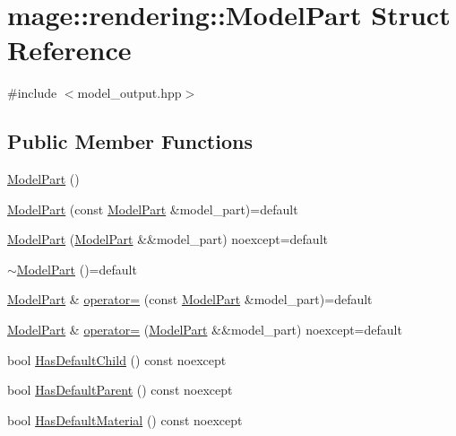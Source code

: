 \hypertarget{structmage_1_1rendering_1_1_model_part}{}\section{mage\+:\+:rendering\+:\+:Model\+Part Struct Reference}
\label{structmage_1_1rendering_1_1_model_part}


{\ttfamily \#include $<$model\+\_\+output.\+hpp$>$}

\subsection*{Public Member Functions}
\begin{DoxyCompactItemize}
\item 
\mbox{\hyperlink{structmage_1_1rendering_1_1_model_part_adb7271a00583f72324ab37ab7e668689}{Model\+Part}} ()
\item 
\mbox{\hyperlink{structmage_1_1rendering_1_1_model_part_ab9f9bbf4d5a08113483d3744b69e7188}{Model\+Part}} (const \mbox{\hyperlink{structmage_1_1rendering_1_1_model_part}{Model\+Part}} \&model\+\_\+part)=default
\item 
\mbox{\hyperlink{structmage_1_1rendering_1_1_model_part_a843671f80d5c36d05d7d147f65fea890}{Model\+Part}} (\mbox{\hyperlink{structmage_1_1rendering_1_1_model_part}{Model\+Part}} \&\&model\+\_\+part) noexcept=default
\item 
\mbox{\hyperlink{structmage_1_1rendering_1_1_model_part_ac01c98a3cab3fb9692bebbfa6ef3fd18}{$\sim$\+Model\+Part}} ()=default
\item 
\mbox{\hyperlink{structmage_1_1rendering_1_1_model_part}{Model\+Part}} \& \mbox{\hyperlink{structmage_1_1rendering_1_1_model_part_a9d6c372839b9493df4b432d8ba2613dc}{operator=}} (const \mbox{\hyperlink{structmage_1_1rendering_1_1_model_part}{Model\+Part}} \&model\+\_\+part)=default
\item 
\mbox{\hyperlink{structmage_1_1rendering_1_1_model_part}{Model\+Part}} \& \mbox{\hyperlink{structmage_1_1rendering_1_1_model_part_a54950b40fa5dd12e77277669cbd6dc3a}{operator=}} (\mbox{\hyperlink{structmage_1_1rendering_1_1_model_part}{Model\+Part}} \&\&model\+\_\+part) noexcept=default
\item 
bool \mbox{\hyperlink{structmage_1_1rendering_1_1_model_part_ab4118a267808c18556b0fa10949bcb0b}{Has\+Default\+Child}} () const noexcept
\item 
bool \mbox{\hyperlink{structmage_1_1rendering_1_1_model_part_ac452d6bba03decae31646eec0329c4ab}{Has\+Default\+Parent}} () const noexcept
\item 
bool \mbox{\hyperlink{structmage_1_1rendering_1_1_model_part_aae8cebe1ec39e939b53fc3f7330984a8}{Has\+Default\+Material}} () const noexcept
\end{DoxyCompactItemize}
